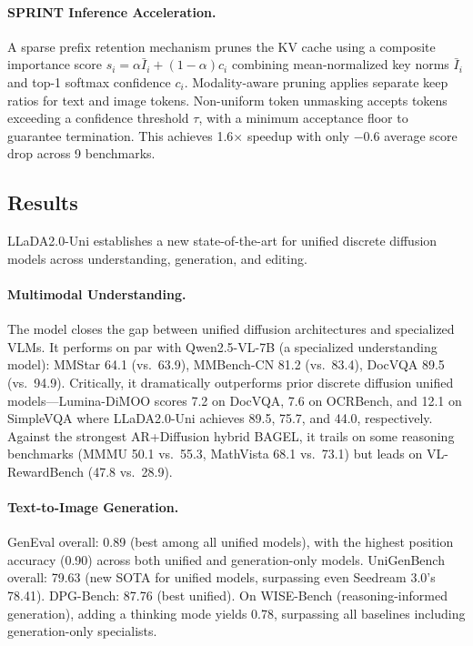 \documentclass[11pt]{article}
\begin{document}
\paragraph{SPRINT Inference Acceleration.}
A sparse prefix retention mechanism prunes the KV cache using a composite importance score $s_i = \alpha \bar{I}_i + (1-\alpha) c_i$ combining mean-normalized key norms $\bar{I}_i$ and top-1 softmax confidence $c_i$. Modality-aware pruning applies separate keep ratios for text and image tokens. Non-uniform token unmasking accepts tokens exceeding a confidence threshold $\tau$, with a minimum acceptance floor to guarantee termination. This achieves 1.6$\times$ speedup with only $-0.6$ average score drop across 9 benchmarks.

\subsection{Results}

LLaDA2.0-Uni establishes a new state-of-the-art for unified discrete diffusion models across understanding, generation, and editing.

\paragraph{Multimodal Understanding.}
The model closes the gap between unified diffusion architectures and specialized VLMs. It performs on par with Qwen2.5-VL-7B (a specialized understanding model): MMStar 64.1 (vs.\ 63.9), MMBench-CN 81.2 (vs.\ 83.4), DocVQA 89.5 (vs.\ 94.9). Critically, it dramatically outperforms prior discrete diffusion unified models---Lumina-DiMOO scores 7.2 on DocVQA, 7.6 on OCRBench, and 12.1 on SimpleVQA where LLaDA2.0-Uni achieves 89.5, 75.7, and 44.0, respectively. Against the strongest AR+Diffusion hybrid BAGEL, it trails on some reasoning benchmarks (MMMU 50.1 vs.\ 55.3, MathVista 68.1 vs.\ 73.1) but leads on VL-RewardBench (47.8 vs.\ 28.9).

\paragraph{Text-to-Image Generation.}
GenEval overall: 0.89 (best among all unified models), with the highest position accuracy (0.90) across both unified and generation-only models. UniGenBench overall: 79.63 (new SOTA for unified models, surpassing even Seedream 3.0's 78.41). DPG-Bench: 87.76 (best unified). On WISE-Bench (reasoning-informed generation), adding a thinking mode yields 0.78, surpassing all baselines including generation-only specialists.
\end{document}
